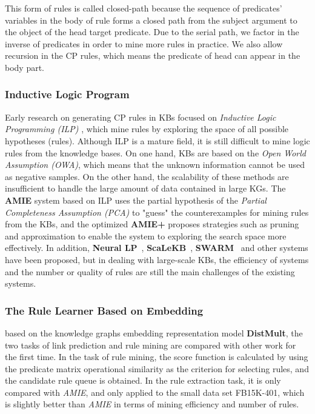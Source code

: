 \documentclass{article}
\begin{document}
	This form of rules is called closed-path because the sequence of predicates' variables in the body of rule forms a closed path from the
subject argument to the object of the head target predicate.
Due to the serial path, we factor in the inverse of predicates in order to mine more rules in practice. We also allow recursion in the CP rules, which means the predicate of head can
appear in the body part.
	
	\subsubsection{Inductive Logic Program} 
	Early research on generating CP rules in KBs focused on {\em Inductive Logic Programming (ILP)}  \cite{Muggleton:ILP}, which mine rules by exploring the space of all possible hypotheses (rules). Although ILP is a mature field, it is still difficult to mine logic rules from the knowledge bases. On one hand, KBs are based on the {\em Open World Assumption (OWA)}, which means that the unknown information cannot be used as negative samples. On the other hand, the scalability of these methods are insufficient to handle the large amount of data contained in large KGs. 
	The {\bf AMIE} \cite{Galarraga:AMIE} system based on ILP uses the partial hypothesis of the {\em Partial Completeness Assumption (PCA)} to "guess" the counterexamples for mining rules from the KBs, and the optimized {\bf AMIE+} \cite{Galarraga:AMIE+} proposes strategies such as pruning and approximation to enable the system to exploring the search space more effectively. In addition, {\bf Neural LP}~\cite{Yang:NeuralLP}, {\bf ScaLeKB}~\cite{Chen:ScaLeKB}, {\bf SWARM}~\cite{Molood:SWARM} and other systems have been proposed, but in dealing with large-scale KBs, the efficiency of systems and the number or quality of rules are still the main challenges of the existing systems.
	
	\subsubsection{The Rule Learner Based on Embedding} 
	\cite{Yang:2015} based on the knowledge graphs embedding representation model {\bf DistMult}, the two tasks of link prediction and rule mining are compared with other work for the first time. In the task of rule mining, the score function is calculated by using the predicate matrix operational similarity as the criterion for selecting rules, and the candidate rule queue is obtained. 
	In the rule extraction task, it is only compared with {\em AMIE}, and only applied to the small data set FB15K-401, which is slightly better than {\em AMIE} in terms of mining efficiency and number of rules. 
	
\end{document}
